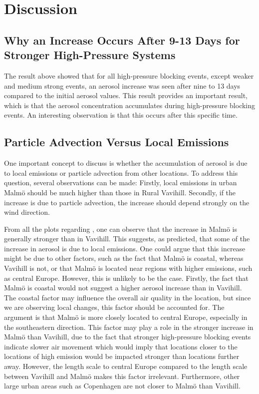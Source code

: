 \newpage
\section{Discussion}
\subsection{Why an Increase Occurs After 9-13 Days for Stronger High-Pressure Systems}
The result above showed that for all high-pressure blocking events, except weaker and medium strong events, an aerosol increase was seen after nine to 13 days compared to the initial aerosol values. This result provides an important result, which is that the aerosol concentration accumulates during high-pressure blocking events. An interesting observation is that this occurs after this specific time. 

\subsection{Particle Advection Versus Local Emissions}
One important concept to discuss is whether the accumulation of aerosol is due to local emissions or particle advection from other locations. To address this question, several observations can be made: Firstly, local emissions in urban Malmö should be much higher than those in Rural Vavihill. Secondly, if the increase is due to particle advection, the increase should depend strongly on the wind direction. 

From all the plots regarding \PM, one can observe that the increase in Malmö is generally stronger than in Vavihill. This suggests, as predicted, that some of the increase in aerosol is due to local emissions. One could argue that this increase might be due to other factors, such as the fact that Malmö is coastal, whereas Vavihill is not, or that Malmö is located near regions with higher emissions, such as central Europe. However, this is unlikely to be the case. Firstly, the fact that Malmö is coastal would not suggest a higher aerosol increase than in Vavihill. The coastal factor may influence the overall air quality in the location, but since we are observing local changes, this factor should be accounted for. The argument is that Malmö is more closely located to central Europe, especially in the southeastern direction. This factor may play a role in the stronger increase in Malmö than Vavihill, due to the fact that stronger high-pressure blocking events indicate slower air movement which would imply  that locations closer to the locations of high emission would be impacted stronger than locations further away. However, the length scale to central Europe compared to the length scale between Vavihill and Malmö makes this factor irrelevant. Furthermore, other large urban areas such as Copenhagen are not closer to Malmö than Vavihill. 

